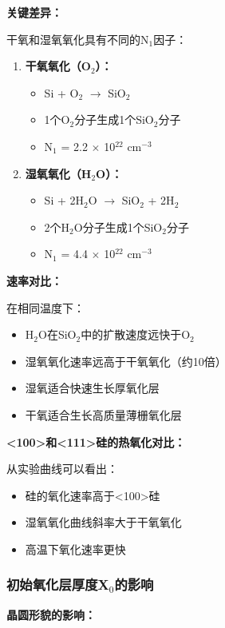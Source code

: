 \documentclass[UTF8,12pt,a4paper]{ctexart}
\begin{document}
\textbf{关键差异：}

干氧和湿氧氧化具有不同的N$_1$因子：

\begin{enumerate}
    \item \textbf{干氧氧化（O$_2$）：}
    \begin{itemize}
        \item Si + O$_2$ $\rightarrow$ SiO$_2$
        \item 1个O$_2$分子生成1个SiO$_2$分子
        \item N$_1$ = 2.2 $\times$ 10$^{22}$ cm$^{-3}$
    \end{itemize}
    
    \item \textbf{湿氧氧化（H$_2$O）：}
    \begin{itemize}
        \item Si + 2H$_2$O $\rightarrow$ SiO$_2$ + 2H$_2$
        \item 2个H$_2$O分子生成1个SiO$_2$分子
        \item N$_1$ = 4.4 $\times$ 10$^{22}$ cm$^{-3}$
    \end{itemize}
\end{enumerate}

\textbf{速率对比：}

在相同温度下：
\begin{itemize}
    \item H$_2$O在SiO$_2$中的扩散速度远快于O$_2$
    \item 湿氧氧化速率远高于干氧氧化（约10倍）
    \item 湿氧适合快速生长厚氧化层
    \item 干氧适合生长高质量薄栅氧化层
\end{itemize}

\textbf{<100>和<111>硅的热氧化对比：}

从实验曲线可以看出：
\begin{itemize}
    \item <111>硅的氧化速率高于<100>硅
    \item 湿氧氧化曲线斜率大于干氧氧化
    \item 高温下氧化速率更快
\end{itemize}

\subsubsection{初始氧化层厚度X$_0$的影响}

\textbf{晶圆形貌的影响：}
\end{document}

